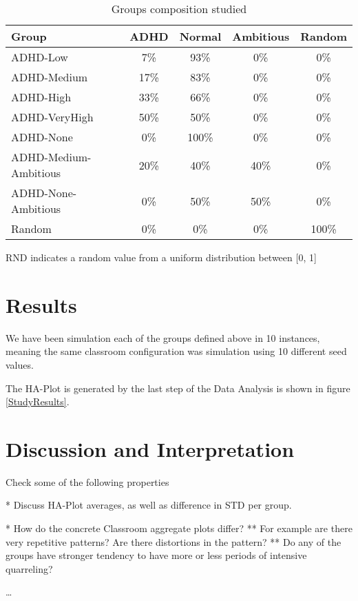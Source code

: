 \begin{table}[h!]
    \centering
    \begin{tabular}{|l|c|c|c|c|} 
        \hline
        \textbf{Group} & \textbf{ADHD} & \textbf{Normal} & \textbf{Ambitious} &  \textbf{Random} \\
        \hline
        \hline
        ADHD-Low & 7\% & 93\% & 0\% & 0\% \\
        \hline
        ADHD-Medium & 17\% & 83\% & 0\% & 0\% \\
        \hline
        ADHD-High & 33\% & 66\% & 0\% & 0\% \\
        \hline
        ADHD-VeryHigh & 50\% & 50\% & 0\% & 0\% \\
        \hline
        ADHD-None & 0\% & 100\% & 0\% & 0\% \\
        \hline
        ADHD-Medium-Ambitious & 20\% & 40\% & 40\% & 0\%\\
        \hline
        ADHD-None-Ambitious & 0\% & 50\% & 50\% & 0\% \\
        \hline
        Random & 0\% & 0\% & 0\% & 100\% \\
        \hline
    \end{tabular}
    \caption{Groups composition studied}
    \small RND indicates a random value from a uniform distribution between [0, 1]
    \label{GroupTable}
\end{table}

\section{Results}
We have been simulation each of the groups defined above in 10 instances, meaning 
the same classroom configuration was simulation using 10 different seed values.

The HA-Plot is generated by the last step of the Data Analysis is shown in figure \ref{StudyResults}.

\begin{figure}[]
\end{figure}

\section{Discussion and Interpretation}
Check some of the following properties

* Discuss HA-Plot averages, as well as difference in STD per group.

* How do the concrete Classroom aggregate plots differ?
    ** For example are there very repetitive patterns? Are there distortions in the pattern?
    ** Do any of the groups have stronger tendency to have more or less periods of intensive quarreling?

\dots


